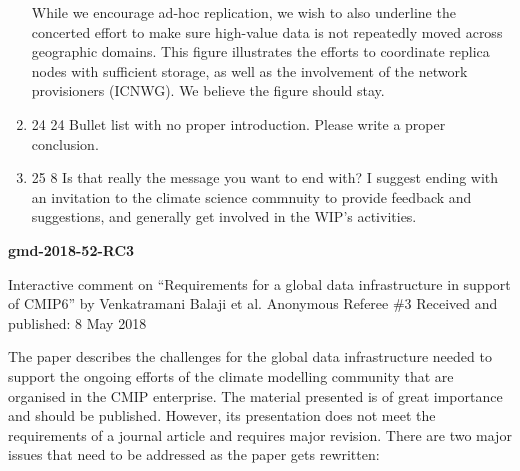 \documentclass[gmd,manuscript]{copernicus}
\newenvironment{answer}{\color{blue}}{}
\begin{document}
\begin{enumerate}[label=RC2-\arabic*,leftmargin=*]
  \begin{answer}
    While we encourage ad-hoc replication, we wish to also underline
    the concerted effort to make sure high-value data is not
    repeatedly moved across geographic domains. This figure
    illustrates the efforts to coordinate replica nodes with
    sufficient storage, as well as the involvement of the network
    provisioners (ICNWG). We believe the figure should stay.
  \end{answer}
\item 24 24 Bullet list with no proper introduction. Please write a
  proper conclusion.
\item 25 8 Is that really the message you want to end with? I suggest
  ending with an invitation to the climate science commnuity to
  provide feedback and suggestions, and generally get involved in the
  WIP’s activities.
\end{enumerate}

\pagebreak


\textbf{gmd-2018-52-RC3}

Interactive comment on “Requirements for a
global data infrastructure in support of CMIP6” by
Venkatramani Balaji et al.
Anonymous Referee \#3
Received and published: 8 May 2018

The paper describes the challenges for the global data infrastructure
needed to support the ongoing efforts of the climate modelling
community that are organised in the CMIP enterprise. The material
presented is of great importance and should be published. However, its
presentation does not meet the requirements of a journal article and
requires major revision. There are two major issues that need to be
addressed as the paper gets rewritten:
\end{document}
